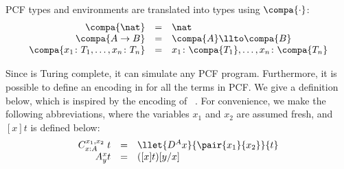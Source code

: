 \documentclass{article}
\begin{document}
\begin{definition}
PCF types and environments are translated into \LLCIrec types using $\compa{\cdot}$:\\
\[
\begin{array}{rcl}
\compa{\nat} & =& \nat \\
\compa{A \to B}& =& \compa{A} \llto \compa{B}\\
\compa{ x_1\colon T_1, \ldots, x_n\colon T_n}
&=& x_1\colon \compa{T_1}, \ldots, x_n\colon \compa{T_n}
\end{array}
\]
\end{definition}
Since \LLCIrec is Turing complete, it can simulate any PCF program. Furthermore, it is possible to define an encoding in \LLCIrec for all the terms in PCF. We give a definition below, which is inspired by
the encoding of \ST~\cite{AlvesS:TCS}. For convenience, we make the
following abbreviations, where the variables $x_1$ and $x_2$ are assumed
fresh, and $[x]t$ is defined below:
\[
\begin{array}{rcl}
C^{x_1,x_2}_{x:A}\;t & = &\llet{D^A x}{\pair{x_1}{x_2}}{t}\\
A^x_y t & = &([x]t)[y/x]\end{array}
\]
\end{document}
